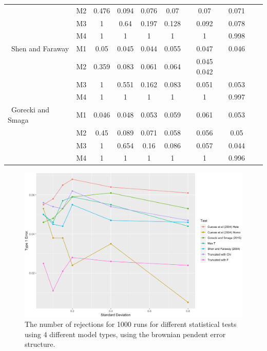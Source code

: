 \documentclass[12pt]{article}
\begin{document}
{\begin{table}[H]
\begin{tabular}{l l c c c c c c c c}
                                 & M2 & 0.476&	0.094&	0.076&	0.07&	0.07&	0.071  \\
                                 & M3 & 1&	0.64&	0.197&	0.128&	0.092&	0.078    \\
                                 & M4 & 1  & 1   & 1   & 1   & 1   & 0.998  \\\hline
                        \ Shen and Faraway   & M1 & 0.05&	0.045&	0.044&	0.055&	0.047&	0.046  \\
                                 & M2 & 0.359&	0.083&	0.061&	0.064&	0.045	0.042  \\
                                 & M3 & 1&	0.551&	0.162&	0.083&	0.051&	0.053 & \\
                                 & M4 & 1&	1&	1&	1&	1&	0.997 \\\hline
                       \ Gorecki and Smaga  & M1 & 0.046&	0.048&	0.053&	0.059&	0.061&	0.053 \\
                                 & M2 & 0.45&	0.089&	0.071&	0.058&	0.056&	0.05   \\
                                 & M3 & 1&	0.654&	0.16&	0.086&	0.057&	0.044    \\
                                 & M4 & 1  & 1   & 1   & 1   & 1   & 0.996   \\  \hline
        \end{tabular}
         \end{table}
}

    \begin{figure}[H]
        \centering
        \includegraphics[scale=0.3]{Type_1_Error_Brownian.png}
        \caption{The number of rejections for 1000 runs for different statistical tests using
        4 different model types, using the brownian pendent error structure.}
    \end{figure}
\end{document}
